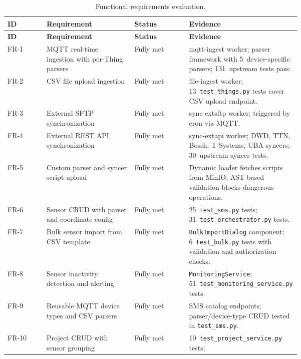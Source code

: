 \begin{landscape}
{\small
\begin{longtable}{l p{0.30\linewidth} l p{0.38\linewidth}}
  \caption{Functional requirements evaluation.}
  \label{tab:req-evaluation-fr} \\
  \textbf{ID} & \textbf{Requirement} & \textbf{Status} & \textbf{Evidence} \\
  \hline
  \endfirsthead
  \textbf{ID} & \textbf{Requirement} & \textbf{Status} & \textbf{Evidence} \\
  \hline
  \endhead
  FR-1  & MQTT real-time ingestion with per-Thing parsers
        & Fully met
        & mqtt-ingest worker; parser framework with 5~device-specific parsers;
          131~upstream tests pass. \\[3pt]
  FR-2  & CSV file upload ingestion
        & Fully met
        & file-ingest worker; 13~\texttt{test\_things.py} tests cover CSV upload
          endpoint. \\[3pt]
  FR-3  & External SFTP synchronization
        & Fully met
        & sync-extsftp worker; triggered by cron via MQTT. \\[3pt]
  FR-4  & External REST API synchronization
        & Fully met
        & sync-extapi worker; DWD, TTN, Bosch, T-Systems, UBA syncers;
          30~upstream syncer tests. \\[3pt]
  FR-5  & Custom parser and syncer script upload
        & Fully met
        & Dynamic loader fetches scripts from MinIO; AST-based validation blocks
          dangerous operations. \\[3pt]
  FR-6  & Sensor CRUD with parser and coordinate config
        & Fully met
        & 25~\texttt{test\_sms.py} tests; 31~\texttt{test\_orchestrator.py}
          tests. \\[3pt]
  FR-7  & Bulk sensor import from CSV template
        & Fully met
        & \texttt{BulkImportDialog} component; 6~\texttt{test\_bulk.py} tests
          with validation and authorization checks. \\[3pt]
  FR-8  & Sensor inactivity detection and alerting
        & Fully met
        & \texttt{MonitoringService}; 51~\texttt{test\_monitoring\_service.py}
          tests. \\[3pt]
  FR-9  & Reusable MQTT device types and CSV parsers
        & Fully met
        & SMS catalog endpoints; parser/device-type CRUD tested in
          \texttt{test\_sms.py}. \\[3pt]
  FR-10 & Project CRUD with sensor grouping
        & Fully met
        & 10~\texttt{test\_project\_service.py} tests;

\end{longtable}}
\end{landscape}
